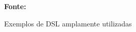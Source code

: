 \begin{figure}[h!]
\centering

\caption{\textmd{Exemplos de DSL amplamente utilizadas}}
\label{fig:exemplosdsl}

\par\medskip\textbf{Fonte:} \cite{mernik2005and} \par\medskip
\end{figure}
